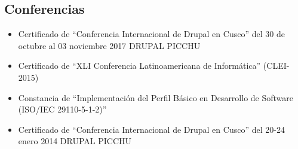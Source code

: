 \documentclass[letterpaper]{twentysecondcv} %
\begin{document}
\subsection{Conferencias}

  \begin{itemize}
	\item Certificado de “Conferencia Internacional de Drupal en Cusco” del 30 de octubre al 03 noviembre 2017 DRUPAL PICCHU
	\item Certificado de “XLI Conferencia Latinoamericana de Informática” (CLEI-2015)
	\item Constancia de “Implementación del Perfil Básico en Desarrollo de Software (ISO/IEC 29110-5-1-2)”
	\item Certificado de “Conferencia Internacional de Drupal en Cusco” del 20-24 enero 2014 DRUPAL PICCHU
  \end{itemize}
\end{document}
